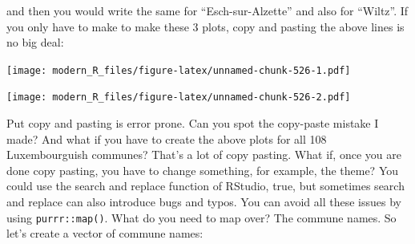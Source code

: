 \documentclass[]{gitbook}
\newenvironment{Shaded}{\begin{snugshade}}{\end{snugshade}}
\newcommand{\DataTypeTok}[1]{\textcolor[rgb]{0.13,0.29,0.53}{#1}}
\newcommand{\KeywordTok}[1]{\textcolor[rgb]{0.13,0.29,0.53}{\textbf{#1}}}
\newcommand{\NormalTok}[1]{#1}
\newcommand{\OperatorTok}[1]{\textcolor[rgb]{0.81,0.36,0.00}{\textbf{#1}}}
\newcommand{\StringTok}[1]{\textcolor[rgb]{0.31,0.60,0.02}{#1}}
\theoremstyle{definition}
\theoremstyle{definition}
\theoremstyle{definition}
\theoremstyle{remark}
\begin{document}
and then you would write the same for ``Esch-sur-Alzette'' and also for
``Wiltz''. If you only have to make to make these 3 plots, copy and
pasting the above lines is no big deal:

\begin{Shaded}
\end{Shaded}

\texttt{[image: modern\_R\_files/figure-latex/unnamed-chunk-526-1.pdf]}

\begin{Shaded}
\end{Shaded}

\texttt{[image: modern\_R\_files/figure-latex/unnamed-chunk-526-2.pdf]}

Put copy and pasting is error prone. Can you spot the copy-paste mistake
I made? And what if you have to create the above plots for all 108
Luxembourguish communes? That's a lot of copy pasting. What if, once you
are done copy pasting, you have to change something, for example, the
theme? You could use the search and replace function of RStudio, true,
but sometimes search and replace can also introduce bugs and typos. You
can avoid all these issues by using \texttt{purrr::map()}. What do you
need to map over? The commune names. So let's create a vector of commune
names:
\end{document}

